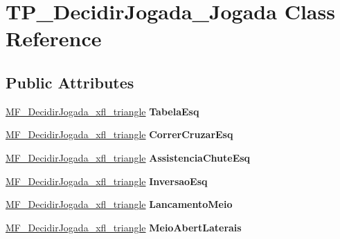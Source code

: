 \hypertarget{classTP__DecidirJogada__Jogada}{
\section{TP\_\-DecidirJogada\_\-Jogada Class Reference}
\label{classTP__DecidirJogada__Jogada}
}
\subsection*{Public Attributes}
\begin{DoxyCompactItemize}
\item 
\hypertarget{classTP__DecidirJogada__Jogada_ab85657d9ec0e01b3d3fd06c89b716261}{
\hyperlink{classMF__DecidirJogada__xfl__triangle}{MF\_\-DecidirJogada\_\-xfl\_\-triangle} {\bfseries TabelaEsq}}
\label{classTP__DecidirJogada__Jogada_ab85657d9ec0e01b3d3fd06c89b716261}

\item 
\hypertarget{classTP__DecidirJogada__Jogada_ae70eb00363c233b8303446e4ae352256}{
\hyperlink{classMF__DecidirJogada__xfl__triangle}{MF\_\-DecidirJogada\_\-xfl\_\-triangle} {\bfseries CorrerCruzarEsq}}
\label{classTP__DecidirJogada__Jogada_ae70eb00363c233b8303446e4ae352256}

\item 
\hypertarget{classTP__DecidirJogada__Jogada_a3b55f3b7d1f03a00043a8c5f69f01767}{
\hyperlink{classMF__DecidirJogada__xfl__triangle}{MF\_\-DecidirJogada\_\-xfl\_\-triangle} {\bfseries AssistenciaChuteEsq}}
\label{classTP__DecidirJogada__Jogada_a3b55f3b7d1f03a00043a8c5f69f01767}

\item 
\hypertarget{classTP__DecidirJogada__Jogada_ab3b9cf31bd46685ee46c6ddc0c684894}{
\hyperlink{classMF__DecidirJogada__xfl__triangle}{MF\_\-DecidirJogada\_\-xfl\_\-triangle} {\bfseries InversaoEsq}}
\label{classTP__DecidirJogada__Jogada_ab3b9cf31bd46685ee46c6ddc0c684894}

\item 
\hypertarget{classTP__DecidirJogada__Jogada_a9ace733cd4590772d5e5b4f574ba8f05}{
\hyperlink{classMF__DecidirJogada__xfl__triangle}{MF\_\-DecidirJogada\_\-xfl\_\-triangle} {\bfseries LancamentoMeio}}
\label{classTP__DecidirJogada__Jogada_a9ace733cd4590772d5e5b4f574ba8f05}

\item 
\hypertarget{classTP__DecidirJogada__Jogada_adfcdeabaf117f45ec272fec8c684e6f8}{
\hyperlink{classMF__DecidirJogada__xfl__triangle}{MF\_\-DecidirJogada\_\-xfl\_\-triangle} {\bfseries MeioAbertLaterais}}
\label{classTP__DecidirJogada__Jogada_adfcdeabaf117f45ec272fec8c684e6f8}


\end{DoxyCompactItemize}
